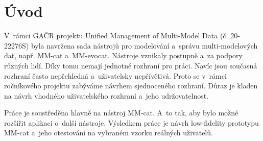 \chapter*{Úvod}

V~rámci GAČR projektu Unified Management of Multi-Model Data (č. 20-22276S) 
byla navržena sada nástrojů pro modelování a~správu multi-modelových dat, 
např. MM-cat a~MM-evocat. Nástroje vznikaly postupně a~za podpory různých 
lidí. Díky tomu nemají jednotné rozhraní pro práci. Navíc jsou současná 
rozhraní často nepřehledná a~uživatelsky nepřívětivá. Proto se v~rámci 
ročníkového projektu zabýváme návrhem sjednoceného rozhraní. Důraz je 
kladen na návrh vhodného uživatelského rozhraní a~jeho udržovatelnost.

Práce je soustředěna hlavně na nástroj MM-cat. A~to tak, aby bylo možné rozšířit aplikaci o~další nástroje. Výsledkem práce je návrh low-fidelity prototypu MM-cat a~jeho otestování na vybraném vzorku reálných uživatelů.
